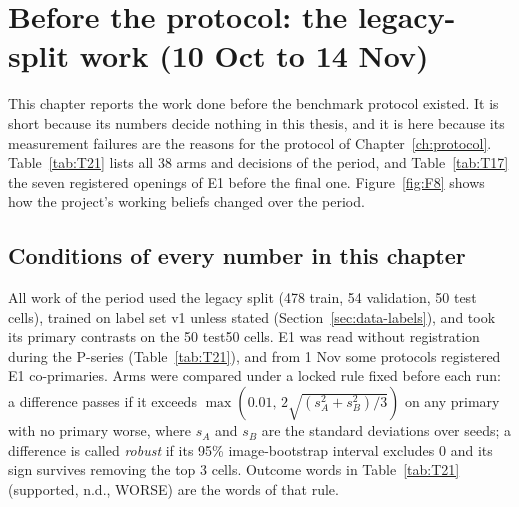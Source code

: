 \chapter{Before the protocol: the legacy-split work (10 Oct to 14 Nov)}\label{ch:legacy}

This chapter reports the work done before the benchmark protocol existed. It is short because its numbers decide nothing in this
thesis, and it is here because its measurement failures are the reasons for the protocol of Chapter~\ref{ch:protocol}.
Table~\ref{tab:T21} lists all 38 arms and decisions of the period, and Table~\ref{tab:T17} the seven registered openings of E1
before the final one. Figure~\ref{fig:F8} shows how the project's working beliefs changed over the period.


\section{Conditions of every number in this chapter}\label{sec:legacy-conditions}

All work of the period used the legacy split (478 train, 54 validation, 50 test cells), trained on label set v1 unless stated
(Section~\ref{sec:data-labels}), and took its primary contrasts on the 50 test50 cells. E1 was read without registration during the P-series (Table~\ref{tab:T21}),
and from 1 Nov some protocols registered E1 co-primaries. Arms were compared under a locked rule fixed before each run: a difference passes if it exceeds
$\max(0.01,\, 2\sqrt{(s_A^2 + s_B^2)/3})$ on any primary with no primary worse, where $s_A$ and $s_B$ are the standard deviations over
seeds; a difference is called \emph{robust} if its 95\% image-bootstrap interval excludes 0 and its sign survives removing the top 3
cells. Outcome words in Table~\ref{tab:T21} (supported, n.d., WORSE) are the words of that rule.

